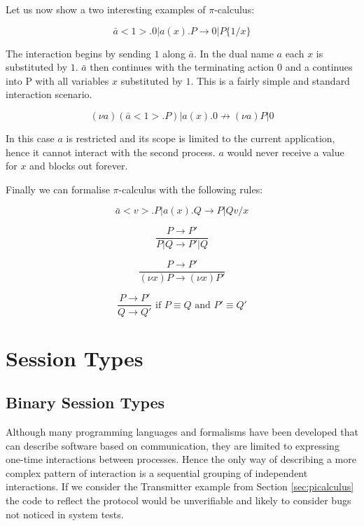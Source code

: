 Let us now show a two interesting examples of $\pi$-calculus:

$$ \bar{a}<1>.0 | a(x).P \longrightarrow 0 | P\{1/x\} $$

The interaction begins by sending $1$ along $\bar{a}$. In the dual name $a$ each $x$ is substituted by $1$. $\bar{a}$ then continues with the terminating action $0$ and a continues into P with all variables $x$ substituted by $1$. This is a fairly simple and standard interaction scenario.

$$ (\nu a)(\bar{a}<1>.P) | a(x).0 \nrightarrow (\nu a) P|0 $$

In this case $a$ is restricted and its scope is limited to the current application, hence it cannot interact with the second process. $a$ would never receive a value for $x$ and blocks out forever.

Finally we can formalise ${\pi}$-calculus with the following rules:

\begin{equation} \bar{a}<v>.P | a(x).Q \longrightarrow P|Q{v/x} \end{equation}

\begin{equation} \frac{P \rightarrow P'}{P|Q \rightarrow P'|Q} \end{equation}

\begin{equation} \frac{P \rightarrow P'}{(\nu x) P \rightarrow (\nu x) P'} \end{equation}

\begin{equation} \frac{P \rightarrow P'}{Q \rightarrow Q'} \mbox{ if } P \equiv Q \mbox{ and } P' \equiv Q' \end{equation}
\newline



\section{Session Types}
\label{sec:sessiontypes}	
	
\subsection{Binary Session Types}
\label{subsec:binsessiontypes}
		
	Although many programming languages and formalisms have been developed that can describe software based on communication, they are limited to expressing one-time interactions between processes. Hence the only way of describing a more complex pattern of interaction is a sequential grouping of independent interactions. If we consider the Transmitter example from Section \ref{sec:picalculus} the code to reflect the protocol would be unverifiable and likely to consider bugs not noticed in system tests.

